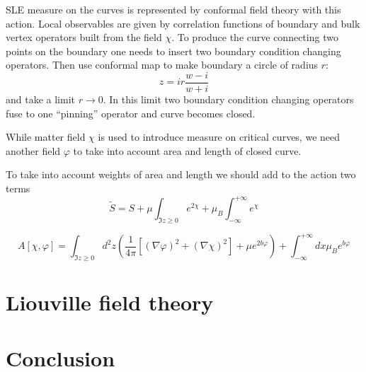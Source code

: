 \documentclass[12pt]{article}
\begin{document}
SLE measure on the curves is represented by conformal field theory with this action. Local
observables are given by correlation functions of boundary and bulk vertex operators built from the
field $\chi$. To produce the curve connecting two points on the boundary one needs to insert two
boundary condition changing operators. Then use conformal map to make boundary a circle of radius
$r$:
\begin{equation}
  \label{eq:9}
  z=i r \frac{w-i}{w+i}
\end{equation}
and take a limit $r\to 0$. In this limit two boundary condition changing operators fuse to one
``pinning'' operator \cite{bettelheim2005harmonic} and curve becomes closed. 

While matter field $\chi$ is used to introduce measure on critical curves, we need another field
$\varphi$ to take into account area and length of closed curve. 

To take into account weights of area and length we should add to the action two terms
\begin{equation}
  \label{eq:8}
  \tilde S=S + \mu \int_{\Im z\geq 0} e^{2\chi} + \mu_{B}\int_{-\infty}^{+\infty} e^{\chi}
\end{equation}

\begin{equation}
  \label{eq:6}
  A[\chi,\varphi]= \int_{\Im z\geq 0} d^{2}z \left(\frac{1}{4\pi} \left[(\nabla \varphi)^{2} +
      (\nabla \chi)^{2}\right] +\mu e^{2b\varphi}\right) +\int_{-\infty}^{+\infty}dx \mu_{B}e^{b\varphi}
\end{equation}


\section{Liouville field theory}
\label{sec:liouv-field-theory}

\section{Conclusion}
\label{sec:conclusion}

{} 

\end{document}
